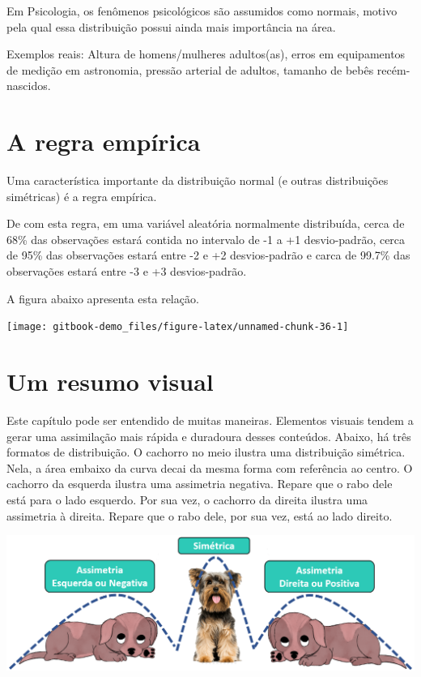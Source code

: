 \documentclass[
]{book}
\begin{document}
Em Psicologia, os fenômenos psicológicos são assumidos como normais, motivo pela qual essa distribuição possui ainda mais importância na área.

Exemplos reais: Altura de homens/mulheres adultos(as), erros em equipamentos de medição em astronomia, pressão arterial de adultos, tamanho de bebês recém-nascidos.

\hypertarget{a-regra-empuxedrica}{%
\section{A regra empírica}\label{a-regra-empuxedrica}}

Uma característica importante da distribuição normal (e outras distribuições simétricas) é a regra empírica.

De com esta regra, em uma variável aleatória normalmente distribuída, cerca de 68\% das observações estará contida no intervalo de -1 a +1 desvio-padrão, cerca de 95\% das observações estará entre -2 e +2 desvios-padrão e carca de 99.7\% das observações estará entre -3 e +3 desvios-padrão.

A figura abaixo apresenta esta relação.

\begin{center}\texttt{[image: gitbook-demo\_files/figure-latex/unnamed-chunk-36-1]} \end{center}

\hypertarget{um-resumo-visual}{%
\section{Um resumo visual}\label{um-resumo-visual}}

Este capítulo pode ser entendido de muitas maneiras. Elementos visuais tendem a gerar uma assimilação mais rápida e duradoura desses conteúdos. Abaixo, há três formatos de distribuição. O cachorro no meio ilustra uma distribuição simétrica. Nela, a área embaixo da curva decai da mesma forma com referência ao centro. O cachorro da esquerda ilustra uma assimetria negativa. Repare que o rabo dele está para o lado esquerdo. Por sua vez, o cachorro da direita ilustra uma assimetria à direita. Repare que o rabo dele, por sua vez, está ao lado direito.

\includegraphics{./img/cap_desc_assimetria.png}
\end{document}
